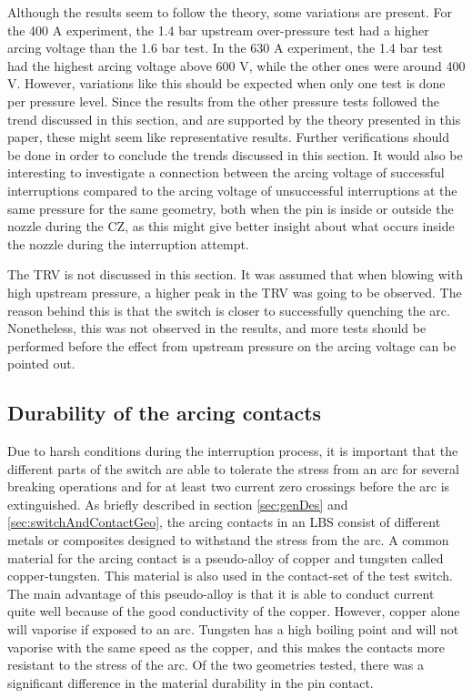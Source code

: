 \documentclass[10pt,a4paper,twoside]{article}
\begin{document}
Although the results seem to follow the theory, some variations are present. For the 400 A experiment, the 1.4 bar upstream over-pressure test had a higher arcing voltage than the 1.6 bar test. In the 630 A experiment, the 1.4 bar test had the highest arcing voltage above 600 V, while the other ones were around 400 V. However, variations like this should be expected when only one test is done per pressure level. Since the results from the other pressure tests followed the trend discussed in this section, and are supported by the theory presented in this paper, these might seem like representative results. Further verifications should be done in order to conclude the trends discussed in this section. It would also be interesting to investigate a connection between the arcing voltage of successful interruptions compared to the arcing voltage of unsuccessful interruptions at the same pressure for the same geometry, both when the pin is inside or outside the nozzle during the CZ, as this might give better insight about what occurs inside the nozzle during the interruption attempt.

The TRV is not discussed in this section. It was assumed that when blowing with high upstream pressure, a higher peak in the TRV was going to be observed. The reason behind this is that the switch is closer to successfully quenching the arc. Nonetheless, this was not observed in the results, and more tests should be performed before the effect from upstream pressure on the arcing voltage can be pointed out. 

\subsection{Durability of the arcing contacts} \label{fig:durability}

Due to harsh conditions during the interruption process, it is important that the different parts of the switch are able to tolerate the stress from an arc for several breaking operations and for at least two current zero crossings before the arc is extinguished. As briefly described in section \ref{sec:genDes} and \ref{sec:switchAndContactGeo}, the arcing contacts in an LBS consist of different metals or composites designed to withstand the stress from the arc. A common material for the arcing contact is a pseudo-alloy of copper and tungsten called copper-tungsten. This material is also used in the contact-set of the test switch. The main advantage of this pseudo-alloy is that it is able to conduct current quite well because of the good conductivity of the copper. However, copper alone will vaporise if exposed to an arc. Tungsten has a high boiling point and will not vaporise with the same speed as the copper, and this makes the contacts more resistant to the stress of the arc. Of the two geometries tested, there was a significant difference in the material durability in the pin contact.
\end{document}
